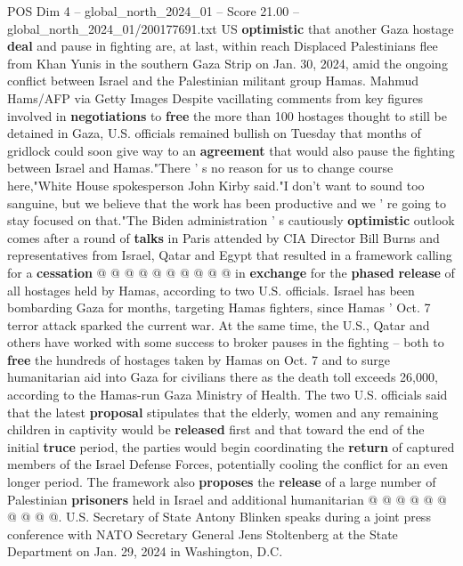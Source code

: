 \begin{textsample}{POS Dim 4 – global\_north\_2024\_01 – Score 21.00 – global\_north\_2024\_01/200177691.txt}  \label{ex:f4_pos_333}
US \textbf{optimistic} that another Gaza hostage \textbf{deal} and pause in fighting are, at last, within reach Displaced Palestinians flee from Khan Yunis in the southern Gaza Strip on Jan. 30, 2024, amid the ongoing conflict between Israel and the Palestinian militant group Hamas.
Mahmud Hams/AFP via Getty Images Despite vacillating comments from key figures involved in \textbf{negotiations} to \textbf{free} the more than 100 hostages thought to still be detained in Gaza, U.S. officials remained bullish on Tuesday that months of gridlock could soon give way to an \textbf{agreement} that would also pause the fighting between Israel and Hamas."There ' s no reason for us to change course here,"White House spokesperson John Kirby said."I don't want to sound too sanguine, but we believe that the work has been productive and we ' re going to stay focused on that."The Biden administration ' s cautiously \textbf{optimistic} outlook comes after a round of \textbf{talks} in Paris attended by CIA Director Bill Burns and representatives from Israel, Qatar and Egypt that resulted in a framework calling for a \textbf{cessation} @ @ @ @ @ @ @ @ @ @ in \textbf{exchange} for the \textbf{phased} \textbf{release} of all hostages held by Hamas, according to two U.S. officials.
Israel has been bombarding Gaza for months, targeting Hamas fighters, since Hamas ' Oct. 7 terror attack sparked the current war.
At the same time, the U.S., Qatar and others have worked with some success to broker pauses in the fighting -- both to \textbf{free} the hundreds of hostages taken by Hamas on Oct. 7 and to surge humanitarian aid into Gaza for civilians there as the death toll exceeds 26,000, according to the Hamas-run Gaza Ministry of Health.
The two U.S. officials said that the latest \textbf{proposal} stipulates that the elderly, women and any remaining children in captivity would be \textbf{released} first and that toward the end of the initial \textbf{truce} period, the parties would begin coordinating the \textbf{return} of captured members of the Israel Defense Forces, potentially cooling the conflict for an even longer period.
The framework also \textbf{proposes} the \textbf{release} of a large number of Palestinian \textbf{prisoners} held in Israel and additional humanitarian @ @ @ @ @ @ @ @ @ @.
U.S.
Secretary of State Antony Blinken speaks during a joint press conference with NATO Secretary General Jens Stoltenberg at the State Department on Jan. 29, 2024 in Washington, D.C.

\end{textsample}
